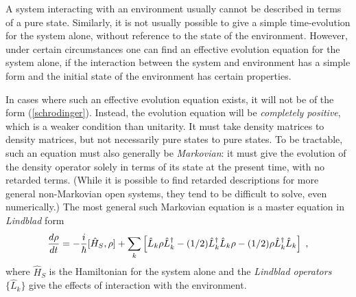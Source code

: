 \documentclass[12pt]{article}
\def\H{{\hat H}}
\def\L{{\hat L}}
\def\Ldag{{\hat L^\dagger}}
\begin{document}
A system interacting with an environment usually cannot
be described in terms of a pure state. Similarly, it is not usually possible
to give a simple time-evolution for the system alone, without reference
to the state of the environment.  However, under certain
circumstances one can find an effective evolution equation
for the system alone, if the interaction between the system and
environment has a simple form and the initial state of the
environment has certain properties.

In cases where such an effective evolution equation exists,
it will not be of the form (\ref{schrodinger}).
Instead, the evolution equation will be {\it completely positive},
which is a weaker condition than unitarity.  It must
take density matrices to density matrices, but not necessarily pure states
to pure states.  To be tractable, such an equation must also generally be
{\it Markovian}:  it must give the evolution of the density operator
solely in terms of its state at the present time, with no retarded terms.
(While it is possible to find retarded descriptions for more general
non-Markovian open systems, they tend to be difficult to solve, even
numerically.)  The most general such Markovian equation \cite{Lindblad}
is a master equation in {\it Lindblad} form
\begin{equation}
{d\rho\over dt} = - {i\over\hbar}[\H_S,\rho] +
  \sum_k \left[ \L_k \rho \Ldag_k - (1/2) \Ldag_k\L_k\rho
  - (1/2)\rho\Ldag_k\L_k \right] \;,
\label{Lindblad}
\end{equation}
where $\H_S$ is the Hamiltonian for the system alone and the
{\it Lindblad operators} $\{\L_k\}$ give the effects of interaction
with the environment.
\end{document}
